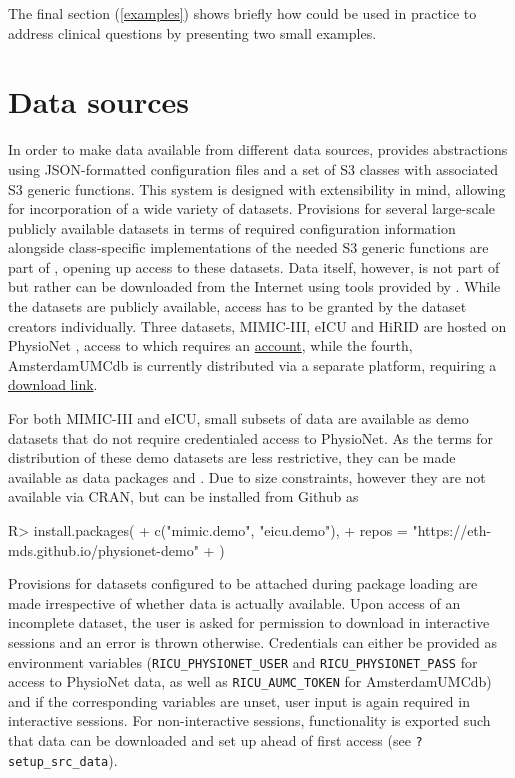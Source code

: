\documentclass[
  notitle]{jss}
\begin{document}
The final section (\ref{examples}) shows briefly how  could be
used in practice to address clinical questions by presenting two small
examples.

\hypertarget{data-sources}{%
\section{Data sources}\label{data-sources}}

In order to make data available from different data sources, 
provides abstractions using JSON-formatted configuration files and a set
of S3 classes with associated S3 generic functions. This system is
designed with extensibility in mind, allowing for incorporation of a
wide variety of datasets. Provisions for several large-scale publicly
available datasets in terms of required configuration information
alongside class-specific implementations of the needed S3 generic
functions are part of , opening up access to these datasets.
Data itself, however, is not part of  but rather can be
downloaded from the Internet using tools provided by . While
the datasets are publicly available, access has to be granted by the
dataset creators individually. Three datasets, MIMIC-III, eICU and HiRID
are hosted on PhysioNet \citep{goldberger2000}, access to which requires
an \href{https://physionet.org/register/}{account}, while the fourth,
AmsterdamUMCdb is currently distributed via a separate platform,
requiring a
\href{https://amsterdammedicaldatascience.nl/\#amsterdamumcdb}{download
link}.

For both MIMIC-III and eICU, small subsets of data are available as demo
datasets that do not require credentialed access to PhysioNet. As the
terms for distribution of these demo datasets are less restrictive, they
can be made available as data packages  and
. Due to size constraints, however they are not available
via CRAN, but can be installed from Github as

\begin{CodeChunk}
\begin{CodeInput}
R> install.packages(
+   c("mimic.demo", "eicu.demo"),
+   repos = "https://eth-mds.github.io/physionet-demo"
+ )
\end{CodeInput}
\end{CodeChunk}

Provisions for datasets configured to be attached during package loading
are made irrespective of whether data is actually available. Upon access
of an incomplete dataset, the user is asked for permission to download
in interactive sessions and an error is thrown otherwise. Credentials
can either be provided as environment variables
(\texttt{RICU\_PHYSIONET\_USER} and \texttt{RICU\_PHYSIONET\_PASS} for
access to PhysioNet data, as well as \texttt{RICU\_AUMC\_TOKEN} for
AmsterdamUMCdb) and if the corresponding variables are unset, user input
is again required in interactive sessions. For non-interactive sessions,
functionality is exported such that data can be downloaded and set up
ahead of first access (see \texttt{?setup\_src\_data}).
\end{document}
